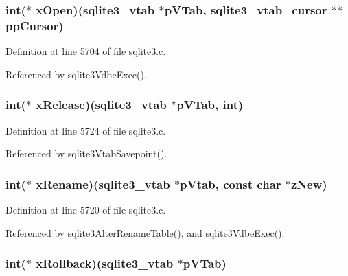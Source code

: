 \subsubsection[{x\+Open}]{\setlength{\rightskip}{0pt plus 5cm}int($\ast$ x\+Open)({\bf sqlite3\+\_\+vtab} $\ast$p\+V\+Tab, {\bf sqlite3\+\_\+vtab\+\_\+cursor} $\ast$$\ast$pp\+Cursor)}\label{structsqlite3__module_a251c7aaab19d614717895337570c4ab1}


Definition at line 5704 of file sqlite3.\+c.



Referenced by sqlite3\+Vdbe\+Exec().

\hypertarget{structsqlite3__module_a81269f73be0d10c575308d9ba552fb42}{}
\subsubsection[{x\+Release}]{\setlength{\rightskip}{0pt plus 5cm}int($\ast$ x\+Release)({\bf sqlite3\+\_\+vtab} $\ast$p\+V\+Tab, int)}\label{structsqlite3__module_a81269f73be0d10c575308d9ba552fb42}


Definition at line 5724 of file sqlite3.\+c.



Referenced by sqlite3\+Vtab\+Savepoint().

\hypertarget{structsqlite3__module_a0e5483244b80bf1a818c40d2317f313b}{}
\subsubsection[{x\+Rename}]{\setlength{\rightskip}{0pt plus 5cm}int($\ast$ x\+Rename)({\bf sqlite3\+\_\+vtab} $\ast$p\+Vtab, const char $\ast$z\+New)}\label{structsqlite3__module_a0e5483244b80bf1a818c40d2317f313b}


Definition at line 5720 of file sqlite3.\+c.



Referenced by sqlite3\+Alter\+Rename\+Table(), and sqlite3\+Vdbe\+Exec().

\hypertarget{structsqlite3__module_ad10fa2ae90ffde704368535d381319c7}{}
\subsubsection[{x\+Rollback}]{\setlength{\rightskip}{0pt plus 5cm}int($\ast$ x\+Rollback)({\bf sqlite3\+\_\+vtab} $\ast$p\+V\+Tab)}\label{structsqlite3__module_ad10fa2ae90ffde704368535d381319c7}


